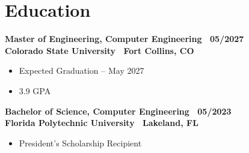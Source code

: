 \section{Education}

\textbf{Master of Engineering, Computer Engineering \textbar\ 05/2027} \\
{\small\textbf{Colorado State University \textbar\ Fort Collins, CO}}

\begin{itemize}
  \item Expected Graduation -- May 2027
  \item 3.9 GPA
\end{itemize}

\textbf{Bachelor of Science, Computer Engineering \textbar\ 05/2023} \\
{\small\textbf{Florida Polytechnic University \textbar\ Lakeland, FL}}

\begin{itemize}
  \item President's Scholarship Recipient
\end{itemize}
